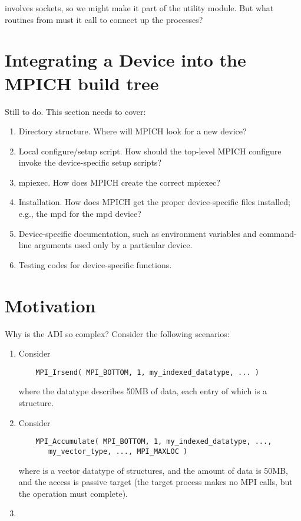 \documentclass{article}
\begin{document}
 involves sockets, so we might make it part of the
utility module.  But what routines from  must it call
to connect up the processes?


%

%


\section{Integrating a Device into the MPICH build tree}
Still to do.  This section needs to cover:
\begin{enumerate}
\item Directory structure.  Where will MPICH look for a new device?
\item Local configure/setup script.  How should the top-level MPICH configure
  invoke the device-specific setup scripts?
\item mpiexec.  How does MPICH create the correct mpiexec?
\item Installation.  How does MPICH get the proper device-specific files
  installed; e.g., the mpd for the mpd device?
\item Device-specific documentation, such as environment variables and
  command-line arguments used only by a particular device.
\item Testing codes for device-specific functions.
\end{enumerate}

\section{Motivation}
Why is the ADI so complex?  Consider the following scenarios:
\begin{enumerate}
\item Consider
\begin{verbatim}
    MPI_Irsend( MPI_BOTTOM, 1, my_indexed_datatype, ... )
\end{verbatim}
where the datatype describes 50MB of data, each entry of which is a
structure.
\item Consider
\begin{verbatim}
    MPI_Accumulate( MPI_BOTTOM, 1, my_indexed_datatype, ..., 
       my_vector_type, ..., MPI_MAXLOC )
\end{verbatim}
where  is
a vector datatype of structures, and the amount of data is 50MB, and
the access is passive target (the target process makes no MPI calls,
but the operation must complete).
\item 
\end{enumerate}
\end{document}
